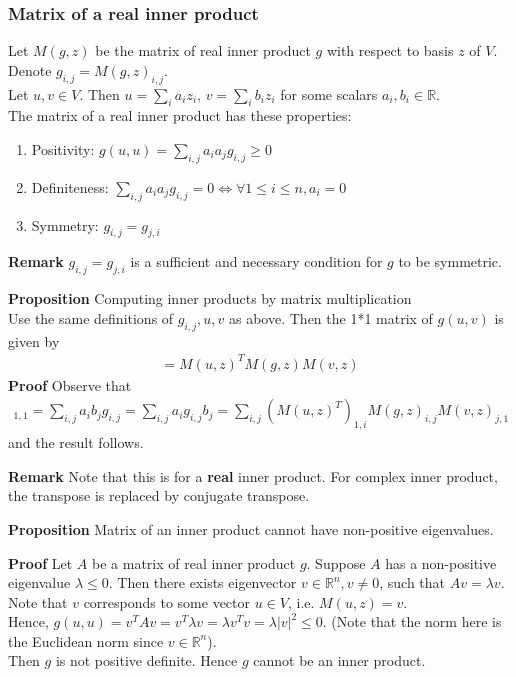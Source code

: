 \documentclass{article}
\begin{document}
\subsubsection{Matrix of a real inner product}
Let $M(g,z)$ be the matrix of real inner product $g$ with respect to basis $z$ of $V$. Denote $g_{i,j}=M(g,z)_{i,j}$.\\
Let $u,v\in V$. Then $u=\sum_i a_iz_i,\, v=\sum_i b_iz_i$ for some scalars $a_i,b_i\in \mathbb{R}$.\\
The matrix of a real inner product has these properties:
\begin{enumerate}
	\item Positivity: $g(u,u)=\sum_{i,j} a_ia_j g_{i,j}\geq 0$
	\item Definiteness: $\sum_{i,j} a_ia_j g_{i,j}=0 \iff \forall 1\leq i\leq n, a_i=0$
	\item Symmetry: $g_{i,j}=g_{j,i}$
\end{enumerate}
\textbf{Remark} $g_{i,j}=g_{j,i}$ is a sufficient and necessary condition for $g$ to be symmetric.

\textbf{Proposition} Computing inner products by matrix multiplication\\
Use the same definitions of $g_{i,j},u,v$ as above. Then the 1*1 matrix of $g(u,v)$ is given by
\begin{align*}
	[g(u,v)] = M(u,z)^TM(g,z)M(v,z)
\end{align*}
\textbf{Proof} Observe that 
\begin{align*}
	[g(u,v)]_{1,1} = \sum_{i,j}a_ib_j g_{i,j} = \sum_{i,j}a_ig_{i,j}b_j = \sum_{i,j}(M(u,z)^T)_{1,i} M(g,z)_{i,j} M(v,z)_{j,1}
\end{align*}
and the result follows.

\textbf{Remark} Note that this is for a \textbf{real} inner product. For complex inner product, the transpose is replaced by conjugate transpose.

\textbf{Proposition} Matrix of an inner product cannot have non-positive eigenvalues.

\textbf{Proof} Let $A$ be a matrix of real inner product $g$. Suppose $A$ has a non-positive eigenvalue $\lambda \leq 0$. Then there exists eigenvector $v\in \mathbb{R}^n, v\neq 0$, such that $Av=\lambda v$. Note that $v$ corresponds to some vector $u\in V$, i.e. $M(u, z)=v$.\\
Hence, $g(u,u)=v^TAv=v^T\lambda v=\lambda v^Tv = \lambda |v|^2 \leq 0$. (Note that the norm here is the Euclidean norm since $v\in \mathbb{R}^n$).\\
Then $g$ is not positive definite. Hence $g$ cannot be an inner product.
\end{document}
